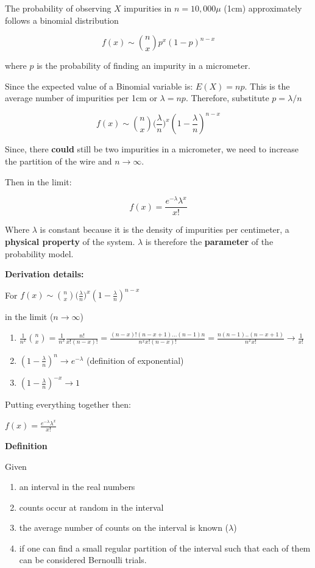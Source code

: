 \documentclass[
]{book}
\providecommand{\tightlist}{%
  \setlength{\itemsep}{0pt}\setlength{\parskip}{0pt}}
\begin{document}
The probability of observing \(X\) impurities in \(n=10,000\mu\) (1cm) approximately follows a binomial distribution

\[f(x) \sim \binom n x p^x(1-p)^{n-x}\]

where \(p\) is the probability of finding an impurity in a micrometer.

Since the expected value of a Binomial variable is:
\(E(X)=np\). This is the average number of impurities per 1cm or \(\lambda=np\). Therefore, substitute \(p=\lambda/n\)

\[f(x) \sim \binom n x \big(\frac{\lambda}{n}\big)^x(1-\frac{\lambda}{n})^{n-x}\]

Since, there \textbf{could} still be two impurities in a micrometer, we need to increase the partition of the wire and \(n \rightarrow \infty\).

Then in the limit:

\[f(x)= \frac{e^{-\lambda}\lambda^x}{x!}\]

Where \(\lambda\) is constant because it is the density of impurities per centimeter, a \textbf{physical property} of the system. \(\lambda\) is therefore the \textbf{parameter} of the probability model.

\textbf{Derivation details:}

For \(f(x) \sim \binom n x \big(\frac{\lambda}{n}\big)^x(1-\frac{\lambda}{n})^{n-x}\)

in the limit (\(n \rightarrow \infty\))

\begin{enumerate}
\def\labelenumi{\arabic{enumi})}
\tightlist
\item
  \(\frac{1}{n^x}\binom n x =\frac{1}{n^x}\frac{n!}{x! (n-x)!}=\frac{(n-x)!(n-x+1)...(n-1)n}{n^x x! (n-x)!}=\frac{n(n-1)..(n-x+1)}{n^x x!} \rightarrow \frac{1}{x!}\)
\item
  \((1-\frac{\lambda}{n})^{n} \rightarrow e^{-\lambda}\) (definition of exponential)
\item
  \((1-\frac{\lambda}{n})^{-x} \rightarrow 1\)
\end{enumerate}

Putting everything together then:

\(f(x)= \frac{e^{-\lambda}\lambda^x}{x!}\)

\textbf{Definition}

Given

\begin{enumerate}
\def\labelenumi{\arabic{enumi})}
\tightlist
\item
  an interval in the real numbers
\item
  counts occur at random in the interval
\item
  the average number of counts on the interval is known (\(\lambda\))
\item
  if one can find a small regular partition of the interval such that each of them can be considered Bernoulli trials.
\end{enumerate}
\end{document}
